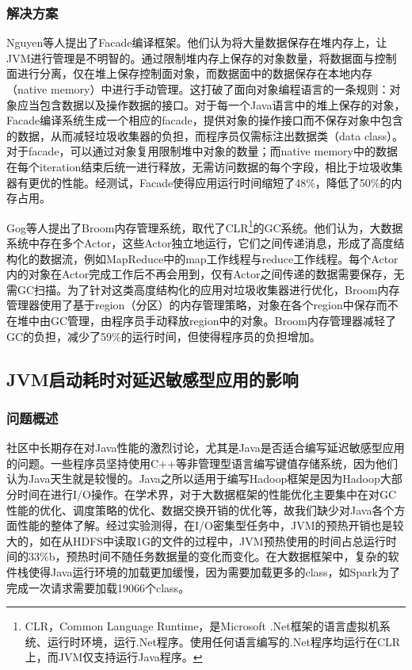 \documentclass[lang=cn,12pt,a4paper,cite=authoryear]{elegantpaper}
\begin{document}
\subsubsection{解决方案}
Nguyen等人提出了Facade\cite{DBLP:conf/asplos/NguyenWBFHX15}编译框架。他们认为将大量数据保存在堆内存上，让JVM进行管理是不明智的。通过限制堆内存上保存的对象数量，将数据面与控制面进行分离，仅在堆上保存控制面对象，而数据面中的数据保存在本地内存（native memory）中进行手动管理。这打破了面向对象编程语言的一条规则：对象应当包含数据以及操作数据的接口。对于每一个Java语言中的堆上保存的对象，Facade编译系统生成一个相应的facade，提供对象的操作接口而不保存对象中包含的数据，从而减轻垃圾收集器的负担，而程序员仅需标注出数据类（data class）。对于facade，可以通过对象复用限制堆中对象的数量；而native memory中的数据在每个iteration结束后统一进行释放，无需访问数据的每个字段，相比于垃圾收集器有更优的性能。经测试，Facade使得应用运行时间缩短了48\%，降低了50\%的内存占用。

Gog等人提出了Broom\cite{DBLP:conf/hotos/GogGSVVRCMHI15}内存管理系统，取代了CLR\footnote{CLR\cite{DBLP:conf/indin/CavalieriSG16}，Common Language Runtime，是Microsoft .Net框架的语言虚拟机系统、运行时环境，运行.Net程序。使用任何语言编写的.Net程序均运行在CLR上，而JVM仅支持运行Java程序。}的GC系统。他们认为，大数据系统中存在多个Actor，这些Actor独立地运行，它们之间传递消息，形成了高度结构化的数据流，例如MapReduce\cite{DBLP:journals/cacm/DeanG08}中的map工作线程与reduce工作线程。每个Actor内的对象在Actor完成工作后不再会用到，仅有Actor之间传递的数据需要保存，无需GC扫描。为了针对这类高度结构化的应用对垃圾收集器进行优化，Broom内存管理器使用了基于region（分区）的内存管理策略\cite{DBLP:conf/padl/ElsmanH20}，对象在各个region中保存而不在堆中由GC管理，由程序员手动释放region中的对象。Broom内存管理器减轻了GC的负担，减少了59\%的运行时间，但使得程序员的负担增加。

\subsection{JVM启动耗时对延迟敏感型应用的影响}
\subsubsection{问题概述}
社区中长期存在对Java性能的激烈讨论，尤其是Java是否适合编写延迟敏感型应用的问题\cite{debate1,debate2,debate3,debate4}。一些程序员坚持使用C++等非管理型语言编写键值存储系统，因为他们认为Java天生就是较慢的。Java之所以适用于编写Hadoop框架是因为Hadoop大部分时间在进行I/O操作\cite{why}。在学术界，对于大数据框架的性能优化主要集中在对GC性能的优化、调度策略的优化、数据交换开销的优化等，故我们缺少对Java各个方面性能的整体了解。经过实验测得，在I/O密集型任务中，JVM的预热开销也是较大的，如在从HDFS中读取1G的文件的过程中，JVM预热使用的时间占总运行时间的33\%b\cite{DBLP:conf/osdi/LionCSZGY16}，预热时间不随任务数据量的变化而变化。在大数据框架中，复杂的软件栈使得Java运行环境的加载更加缓慢，因为需要加载更多的class，如Spark为了完成一次请求需要加载19066个class。
\end{document}
